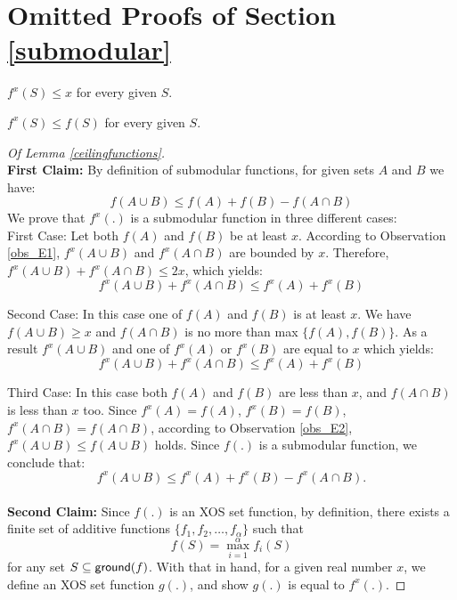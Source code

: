 \section{Omitted Proofs of Section \ref{submodular}}\label{submodular-appendix}

\begin{observation}\label{obs_E1}
$f^x(S) \leq x$ for every given $S$.
\end{observation}

\begin{observation}\label{obs_E2}
$f^x(S) \leq f(S)$ for every given $S$.
\end{observation}

\begin{proof}[Of Lemma \ref{ceilingfunctions}]
\\
\textbf{First Claim:} By definition of submodular functions, for given sets $A$ and $B$ we have:
$$ f(A \cup B) \leq f(A) + f(B) - f(A \cap B)  $$
We prove that $f^x(.)$ is a submodular function in three different cases:\\

First Case: Let both $f(A)$ and $f(B)$ be at least $x$. According to Observation \ref{obs_E1}, $f^x(A \cup B)$ and $f^x(A \cap B)$ are bounded by $x$. Therefore, $f^x(A \cup B) + f^x(A \cap B) \leq 2x$, which yields: 
$$f^x(A \cup B) + f^x(A \cap B) \leq f^x(A) + f^x(B)$$

Second Case: In this case one of $f(A)$ and $f(B)$ is at least $x$. We have $f(A \cup B) \geq x$ and $f(A \cap B)$ is no more than max $\{f(A), f(B)\}$. As a result $f^x(A \cup B)$ and one of $f^x(A)$ or $f^x(B)$ are equal to $x$ which yields:
$$f^x(A \cup B) + f^x(A \cap B) \leq f^x(A) + f^x(B)$$

Third Case: In this case both $f(A)$ and $f(B)$ are less than $x$, and $f(A \cap B)$ is less than $x$ too. Since $f^x(A) = f(A)$, $f^x(B) = f(B)$, $f^x(A \cap B) = f(A \cap B)$, according to Observation \ref{obs_E2}, $f^x(A \cup B) \leq f(A \cup B)$ holds. Since $f(.)$ is a submodular function, we conclude that:
$$f^x(A \cup B) \leq f^x(A) + f^x(B) - f^x(A \cap B).$$\\
\textbf{Second Claim:} Since $f(.)$ is an XOS set function, by definition, there exists a finite set of additive functions  $\{f_1, f_2, \ldots, f_{\alpha}\}$ such that $$f(S) = \max_{i=1}^{\alpha} f_i(S)$$ for any set $S \subseteq \mathsf{ground}(f)$. With that in hand, for a given real number $x$, we define an XOS set function $g(.)$, and show $g(.)$ is equal to $f^{x}(.)$.


\end{proof}
